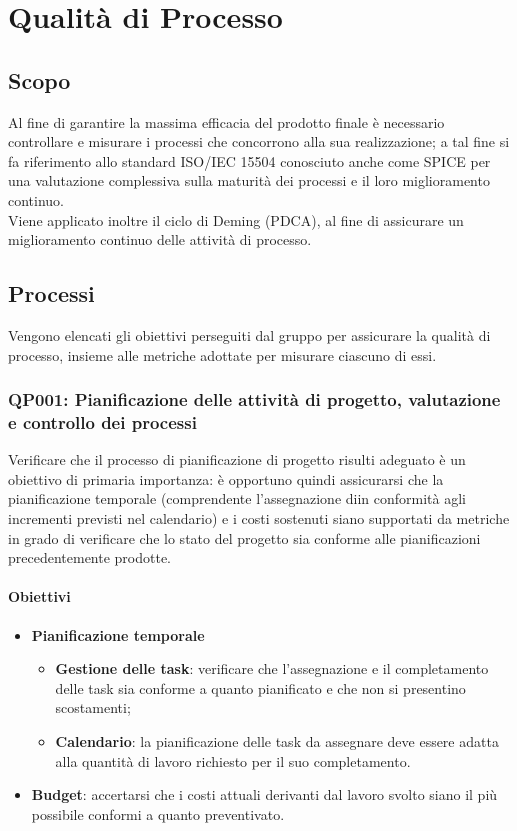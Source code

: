 \chapter{Qualità di Processo}
\label{processo} 
\section{Scopo}
Al fine di garantire la massima efficacia del prodotto finale è necessario controllare e misurare i processi che concorrono alla sua realizzazione; a tal fine si fa riferimento allo standard ISO/IEC 15504 conosciuto anche come SPICE per una valutazione complessiva sulla maturità dei processi e il loro miglioramento continuo.\\
Viene applicato inoltre il ciclo di Deming (PDCA), al fine di assicurare un miglioramento continuo delle attività di processo. 

\section{Processi}\label{processi}
Vengono elencati gli obiettivi perseguiti dal gruppo per assicurare la qualità di processo, insieme alle metriche adottate per misurare ciascuno di essi.
\subsection{QP001: Pianificazione delle attività di progetto, valutazione e controllo dei processi}
Verificare che il processo di pianificazione di progetto risulti adeguato è un obiettivo di primaria importanza: è opportuno quindi assicurarsi che la pianificazione temporale (comprendente l'assegnazione diin conformità agli incrementi previsti nel calendario) e i costi sostenuti siano supportati da metriche in grado di verificare che lo stato del progetto sia conforme alle pianificazioni precedentemente prodotte.


\subsubsection{Obiettivi}
\begin{itemize}
	\item \textbf{Pianificazione temporale}
	\begin{itemize}
		\item \textbf{Gestione delle task}: verificare che l'assegnazione e il completamento delle task sia conforme a quanto pianificato e che non si presentino scostamenti;
		\item \textbf{Calendario}: la pianificazione delle task da assegnare deve essere adatta alla quantità di lavoro richiesto per il suo completamento.
	\end{itemize}
	\item \textbf{Budget}: accertarsi che i costi attuali derivanti dal lavoro svolto siano il più possibile conformi a quanto preventivato.
\end{itemize}
